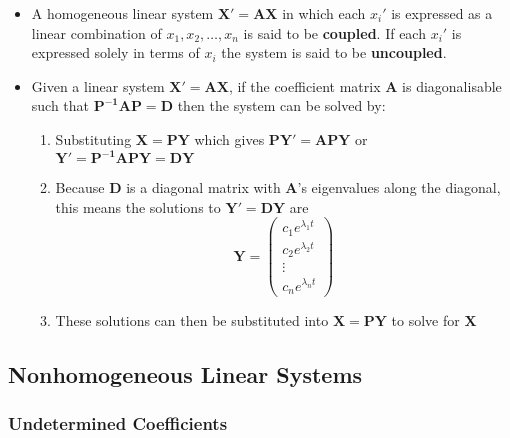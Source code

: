 \documentclass{article}
\begin{document}
\begin{itemize}
  \item A homogeneous linear system $\mathbf{X}' = \mathbf{A} \mathbf{X}$ in which each $x_i'$ is expressed as a linear combination of $x_1, x_2, \ldots, x_n$ is said to be \textbf{coupled}. If each $x_i'$ is expressed solely in terms of $x_i$ the system is said to be \textbf{uncoupled}.

  \item Given a linear system $\mathbf{X' = A X}$, if the coefficient matrix $\mathbf{A}$ is diagonalisable such that $\mathbf{P^{-1} A P = D}$ then the system can be solved by:

        \begin{enumerate}
          \item Substituting $\mathbf{X = P Y}$ which gives $\mathbf{P Y' = A P Y}$ or \\ $\mathbf{Y' = P^{-1} A P Y = D Y}$

          \item Because $\mathbf{D}$ is a diagonal matrix with $\mathbf{A}$'s eigenvalues along the diagonal, this means the solutions to $\mathbf{Y' = D Y}$ are \[\mathbf{Y} = \begin{pmatrix}
                    c_1 e^{\lambda_1 t} \\
                    c_2 e^{\lambda_2 t} \\
                    \vdots              \\
                    c_n e^{\lambda_n t}
                  \end{pmatrix}\]

          \item These solutions can then be substituted into $\mathbf{X = P Y}$ to solve for $\mathbf{X}$
        \end{enumerate}
\end{itemize}

\subsection{Nonhomogeneous Linear Systems}

\subsubsection{Undetermined Coefficients}
\end{document}
